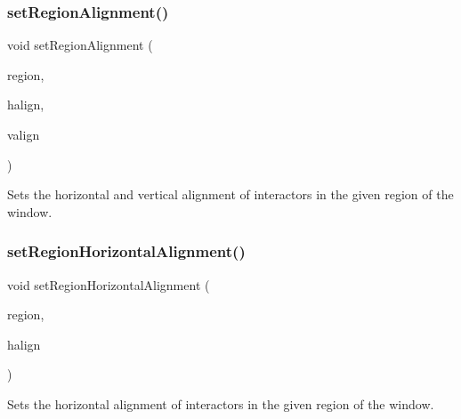 \subsubsection{\texorpdfstring{set\+Region\+Alignment()}{setRegionAlignment()}\hspace{0.1cm}{\footnotesize\ttfamily [5/5]}}
{\footnotesize\ttfamily void set\+Region\+Alignment (\begin{DoxyParamCaption}\item[{const std\+::string \&}]{region,  }\item[{const std\+::string \&}]{halign,  }\item[{const std\+::string \&}]{valign }\end{DoxyParamCaption})\hspace{0.3cm}{\ttfamily [virtual]}}



Sets the horizontal and vertical alignment of interactors in the given region of the window. 

\mbox{\label{classsgl_1_1GWindow_aca8f01ef261afca9c843589e8be54134}} 
\subsubsection{\texorpdfstring{set\+Region\+Horizontal\+Alignment()}{setRegionHorizontalAlignment()}\hspace{0.1cm}{\footnotesize\ttfamily [1/2]}}
{\footnotesize\ttfamily void set\+Region\+Horizontal\+Alignment (\begin{DoxyParamCaption}\item[{\mbox{\hyperlink{classsgl_1_1GWindow_a81a01a86de31071a92e6cce0bab9bc4b}{Region}}}]{region,  }\item[{\mbox{\hyperlink{namespacesgl_aa00e70829e72ff16addc4d9f06fe3bc5}{Horizontal\+Alignment}}}]{halign }\end{DoxyParamCaption})\hspace{0.3cm}{\ttfamily [virtual]}}



Sets the horizontal alignment of interactors in the given region of the window. 

\mbox{\label{classsgl_1_1GWindow_aefb97090ff4e149f8a0cce9efee3c451}} 
